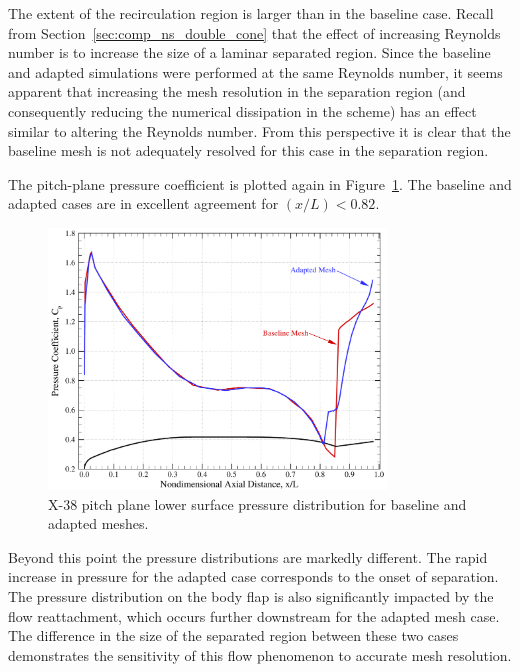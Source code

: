 The extent of the recirculation region is larger than in the baseline case.  Recall from Section~\ref{sec:comp_ns_double_cone} that the effect of increasing Reynolds number is to increase the size of a laminar separated region.  Since the baseline and adapted simulations were performed at the same Reynolds number, it seems apparent that increasing the mesh resolution in the separation region (and consequently reducing the numerical dissipation in the scheme) has an effect similar to altering the Reynolds number.  From this perspective it is clear that the baseline mesh is not adequately resolved for this case in the separation region.

\enlargethispage{\baselineskip}
The pitch-plane pressure coefficient is plotted again in Figure~\ref{fig:x38_pitch_plane_cp_refined}.
The baseline and adapted cases are in excellent agreement for $(x/L)<0.82$.
\begin{figure}[hbtp]
  \begin{center}
    \includegraphics[width=0.8\textwidth]{figures/x38/Cp_a40_refined}
    \caption{X-38 pitch plane lower surface pressure distribution for baseline and adapted meshes.\label{fig:x38_pitch_plane_cp_refined}}
  \end{center}
\end{figure}
Beyond this point the pressure distributions are markedly different.  The rapid increase in pressure for the adapted case corresponds to the onset of separation.  The pressure distribution on the body flap is also significantly impacted by the flow reattachment, which occurs further downstream for the adapted mesh case.  The difference in the size of the separated region between these two cases demonstrates the sensitivity of this flow phenomenon to accurate mesh resolution.



